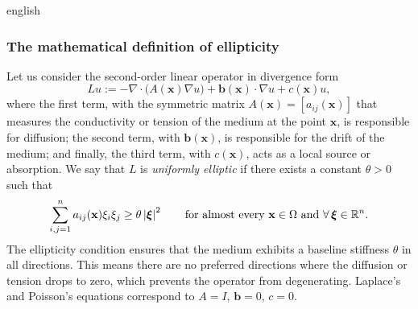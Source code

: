 \begin{hyphenrules}{english}
\subsubsection{The mathematical definition of ellipticity}
Let us consider the second-order linear operator in divergence form
\begin{equation}
  Lu:=-\nabla\cdot\big(A(\mathbf{x})\nabla u\big)+\mathbf{b}(\mathbf{x})\cdot\nabla u+c(\mathbf{x})u,
  \label{eq:elliptic-op}
\end{equation}
where the first term, with the symmetric matrix $A(\mathbf{x})=[a_{ij}(\mathbf{x})]$ that measures the conductivity or
tension of the medium at the point $\mathbf{x}$, is responsible for diffusion; the second term,
with $\mathbf{b}(\mathbf{x})$, is responsible for the drift of the medium; and finally, the third term, with $c(\mathbf{x})$,
acts as a local source or absorption. We say that $L$ is \emph{uniformly elliptic} if there exists a
constant $\theta>0$ such that
\begin{equation}
  \sum_{i,j=1}^{n}a_{ij}(\mathbf{x})\xi_i\xi_j\ge\theta\left\lvert \bm\xi \right\rvert^2\qquad
  \text{for almost every }\mathbf{x}\in\Omega\text{ and }\forall\,\bm\xi\in\mathbb{R}^n.
  \label{eq:uniform-ellipticity}
\end{equation}
The ellipticity condition ensures that the medium exhibits a baseline stiffness $\theta$ in all
directions. This means there are no preferred directions where the diffusion or tension drops to zero,
which prevents the operator from degenerating. Laplace's and Poisson's equations correspond to $A=I$,
$\mathbf{b}=0$, $c=0$.


\end{hyphenrules}
